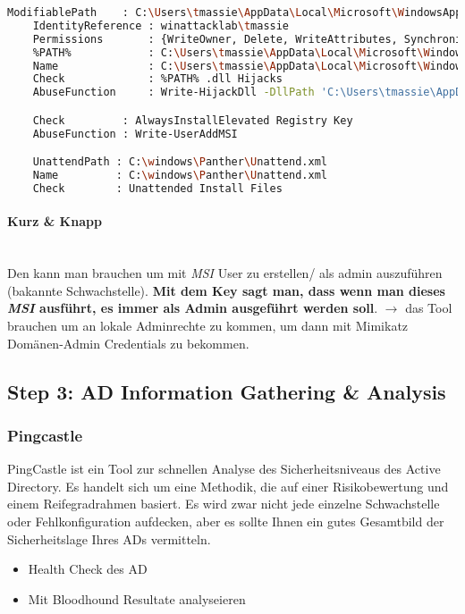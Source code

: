 \begin{lstlisting}[language=bash]
    ModifiablePath    : C:\Users\tmassie\AppData\Local\Microsoft\WindowsApps
    IdentityReference : winattacklab\tmassie
    Permissions       : {WriteOwner, Delete, WriteAttributes, Synchronize...}
    %PATH%            : C:\Users\tmassie\AppData\Local\Microsoft\WindowsApps
    Name              : C:\Users\tmassie\AppData\Local\Microsoft\WindowsApps
    Check             : %PATH% .dll Hijacks
    AbuseFunction     : Write-HijackDll -DllPath 'C:\Users\tmassie\AppData\Local\Microsoft\WindowsApps\wlbsctrl.dll'

    Check         : AlwaysInstallElevated Registry Key
    AbuseFunction : Write-UserAddMSI

    UnattendPath : C:\windows\Panther\Unattend.xml
    Name         : C:\windows\Panther\Unattend.xml
    Check        : Unattended Install Files
\end{lstlisting}

\paragraph{Kurz \& Knapp}\mbox{} \\
Den kann man brauchen um mit \textit{MSI} User zu erstellen/ als admin auszuführen (bakannte Schwachstelle). \textbf{Mit dem Key sagt man, dass wenn man dieses \textit{MSI} ausführt, es immer als Admin ausgeführt werden soll}.
$\rightarrow$ das Tool brauchen um an lokale Adminrechte zu kommen, um dann mit Mimikatz Domänen-Admin Credentials zu bekommen.

\subsection{Step 3: AD Information Gathering \& Analysis}

\subsubsection{Pingcastle}
PingCastle ist ein Tool zur schnellen Analyse des Sicherheitsniveaus des Active Directory. Es handelt sich um eine Methodik, die auf einer Risikobewertung und einem Reifegradrahmen basiert. Es wird zwar nicht jede einzelne Schwachstelle oder Fehlkonfiguration aufdecken, aber es sollte Ihnen ein gutes Gesamtbild der Sicherheitslage Ihres ADs vermitteln.
\begin{itemize}
    \item Health Check des AD
    \item Mit Bloodhound Resultate analyseieren
\end{itemize}

